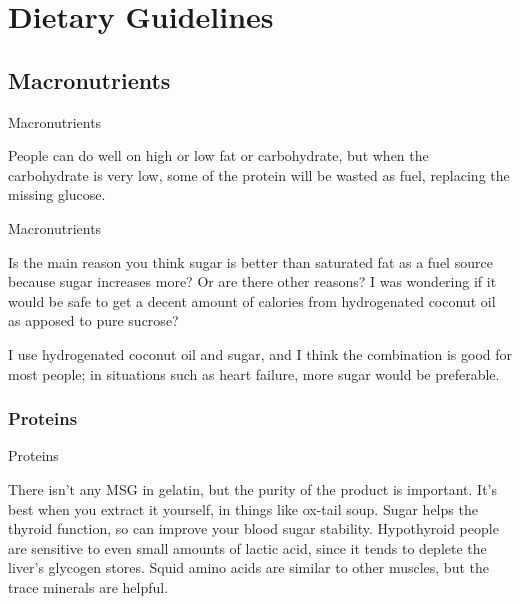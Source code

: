 \documentclass[11pt,oneside,openany,extrafontsizes]{memoir}
\begin{document}
\chapter{Dietary Guidelines}

\section{Macronutrients}

\begin{standalonequote}{Macronutrients}

    \begin{answer}
        People can do well on high or low fat or carbohydrate, but when the carbohydrate is very low, some of the protein will be wasted as fuel, replacing the missing glucose.
    \end{answer}
\end{standalonequote}

\begin{qaexchange}{Macronutrients}

    \begin{question}
        Is the main reason you think sugar is better than saturated fat as a fuel source because sugar increases  more? Or are there other reasons? I was wondering if it would be safe to get a decent amount of calories from hydrogenated coconut oil as apposed to pure sucrose?
    \end{question}

    \begin{answer}
      I use hydrogenated coconut oil and sugar, and I think the combination is good for most people; in situations such as heart failure, more sugar would be preferable.
    \end{answer}
\end{qaexchange}

\subsection{Proteins}

\begin{standalonequote}{Proteins}

    \begin{answer}
        There isn't any MSG in gelatin, but the purity of the product is important. It's best when you extract it yourself, in things like ox-tail soup. Sugar helps the thyroid function, so can improve your blood sugar stability. Hypothyroid people are sensitive to even small amounts of lactic acid, since it tends to deplete the liver's glycogen stores. Squid amino acids are similar to other muscles, but the trace minerals are helpful.
    \end{answer}
\end{standalonequote}
\end{document}
